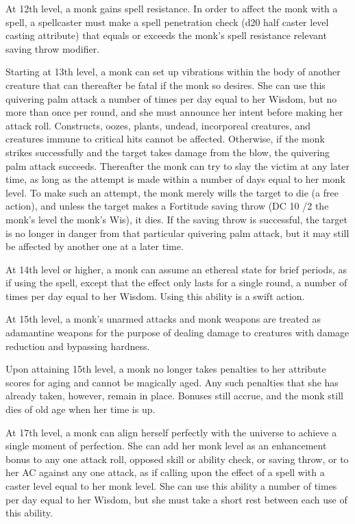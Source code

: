  At 12th level, a monk gains spell resistance. In order to affect the monk with a spell, a spellcaster must make a spell penetration check (d20 \add half caster level \add casting attribute) that equals or exceeds the monk's spell resistance \add relevant saving throw modifier.

 Starting at 13th level, a monk can set up vibrations within the body of another creature that can thereafter be fatal if the monk so desires. She can use this quivering palm attack a number of times per day equal to her Wisdom, but no more than once per round, and she must announce her intent before making her attack roll. Constructs, oozes, plants, undead, incorporeal creatures, and creatures immune to critical hits cannot be affected. Otherwise, if the monk strikes successfully and the target takes damage from the blow, the quivering palm attack succeeds. Thereafter the monk can try to slay the victim at any later time, as long as the attempt is made within a number of days equal to her monk level. To make such an attempt, the monk merely wills the target to die (a free action), and unless the target makes a Fortitude saving throw (DC 10 /2 the monk's level \add the monk's Wis), it dies. If the saving throw is successful, the target is no longer in danger from that particular quivering palm attack, but it may still be affected by another one at a later time.

 At 14th level or higher, a monk can assume an ethereal state for brief periods, as if using the  spell, except that the effect only lasts for a single round, a number of times per day equal to her Wisdom. Using this ability is a swift action.

 At 15th level, a monk's unarmed attacks and monk weapons are treated as adamantine weapons for the purpose of dealing damage to creatures with damage reduction and bypassing hardness.

 Upon attaining 15th level, a monk no longer takes penalties to her attribute scores for aging and cannot be magically aged. Any such penalties that she has already taken, however, remain in place. Bonuses still accrue, and the monk still dies of old age when her time is up.

 At 17th level, a monk can align herself perfectly with the universe to achieve a single moment of perfection. She can add her monk level as an enhancement bonus to any one attack roll, opposed skill or ability check, or saving throw, or to her AC against any one attack, as if calling upon the effect of a  spell with a caster level equal to her monk level. She can use this ability a number of times per day equal to her Wisdom, but she must take a short rest between each use of this ability.


